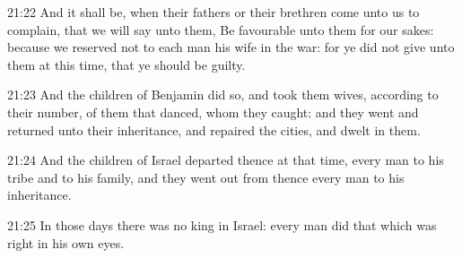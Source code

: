 21:22 And it shall be, when their fathers or their brethren come unto us to complain, that we will say unto them, Be favourable unto them for our sakes: because we reserved not to each man his wife in the war: for ye did not give unto them at this time, that ye should be guilty.

21:23 And the children of Benjamin did so, and took them wives, according to their number, of them that danced, whom they caught: and they went and returned unto their inheritance, and repaired the cities, and dwelt in them.

21:24 And the children of Israel departed thence at that time, every man to his tribe and to his family, and they went out from thence every man to his inheritance.

21:25 In those days there was no king in Israel: every man did that which was right in his own eyes.

